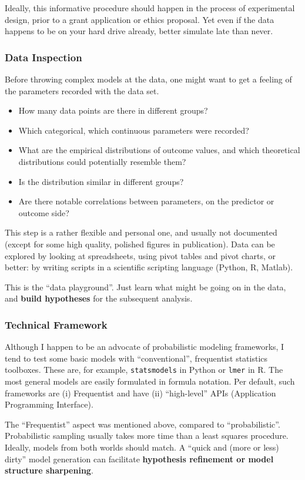 Ideally, this informative procedure should happen in the process of experimental design, prior to a grant application or ethics proposal.
Yet even if the data happens to be on your hard drive already, better simulate late than never.


\subsubsection{Data Inspection}
\label{sec:orga128476}
Before throwing complex models at the data, one might want to get a feeling of the parameters recorded with the data set.
\begin{itemize}
\item How many data points are there in different groups?
\item Which categorical, which continuous parameters were recorded?
\item What are the empirical distributions of outcome values, and which theoretical distributions could potentially resemble them?
\item Is the distribution similar in different groups?
\item Are there notable correlations between parameters, on the predictor or outcome side?
\end{itemize}

This step is a rather flexible and personal one, and usually not documented (except for some high quality, polished figures in publication).
Data can be explored by looking at spreadsheets, using pivot tables and pivot charts, or better: by writing scripts in a scientific scripting language (Python, R, Matlab).

This is the ``data playground''.
Just learn what might be going on in the data, and \textbf{build hypotheses} for the subsequent analysis.


\subsubsection{Technical Framework}
\label{workflow:framework}
Although I happen to be an advocate of probabilistic modeling frameworks, I tend to test some basic models with ``conventional'', frequentist statistics toolboxes.
These are, for example, \texttt{statsmodels} in Python or \texttt{lmer} in R.
The most general models are easily formulated in formula notation.
Per default, such frameworks are (i) Frequentist and have (ii) ``high-level'' APIs (Application Programming Interface).

The ``Frequentist'' aspect was mentioned above, compared to ``probabilistic''.
Probabilistic sampling usually takes more time than a least squares procedure.
Ideally, models from both worlds should match.
A ``quick and (more or less) dirty'' model generation can facilitate \textbf{hypothesis refinement or model structure sharpening}.


